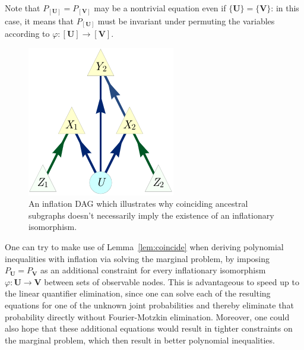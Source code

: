 

Note that $P_{[\bm{U}]} = P_{[\bm{V}]}$ may be a nontrivial equation even if $\{\bm{U}\}=\{\bm{V}\}$: in this case, it means that $P_{[\bm{U}]}$ must be invariant under permuting the variables according to $\varphi:[\bm{U}]\to[\bm{V}]$.

\begin{figure}[H]
    \centering
    \begin{minipage}[t]{0.6\linewidth}      \centering
    \includegraphics[scale=1]{instrumentalvariant.pdf}
    \caption{An inflation DAG which illustrates why coinciding ancestral subgraphs doesn't necessarily imply the existence of an inflationary isomorphism.}
    \label{fig:ancestralsubgraphnotenough}
    \end{minipage}
\end{figure}


One can try to make use of Lemma~\ref{lem:coincide} when deriving polynomial inequalities with inflation via solving the marginal problem, by imposing $P_{\bm{U}} = P_{\bm{V}}$ as an additional constraint for every inflationary isomorphism $\varphi : \bm{U}\to\bm{V}$ between sets of observable nodes. This is advantageous to speed up to the linear quantifier elimination, since one can solve each of the resulting equations for one of the unknown joint probabilities and thereby eliminate that probability directly without Fourier-Motzkin elimination. Moreover, one could also hope that these additional equations would result in tighter constraints on the marginal problem, which then result in better polynomial inequalities.

